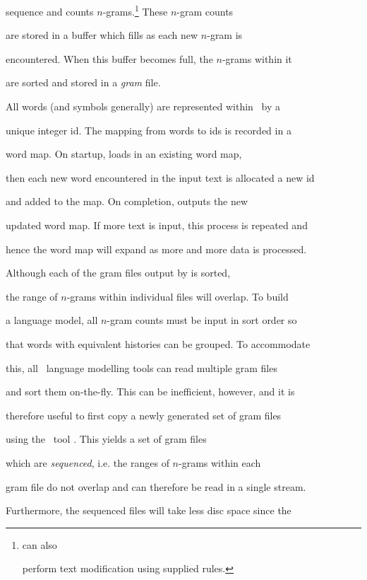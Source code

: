 sequence and counts $n$-grams.\footnote{ can also


perform text modification using supplied rules.}  These $n$-gram counts


are stored in a buffer which fills as each new $n$-gram is


encountered.  When this buffer becomes full, the $n$-grams within it


are sorted and stored in a \textit{gram} file.


All words (and symbols generally) are represented within \HTK\ by a


unique integer id.  The mapping from words to ids is recorded in a


word map.  On startup,  loads in an existing word map,


then each new word encountered in the input text is allocated a new id


and added to the map.  On completion,  outputs the new


updated word map.  If more text is input, this process is repeated and


hence the word map will expand as more and more data is processed.





Although each of the gram files output by  is sorted,


the range of $n$-grams within individual files will overlap.  To build


a language model, all $n$-gram counts must be input in sort order so


that words with equivalent histories can be grouped. To accommodate


this, all \HTK\ language modelling tools can read multiple gram files


and sort them on-the-fly.  This can be inefficient, however, and it is


therefore useful to first copy a newly generated set of gram files


using the \HLM\ tool .  This yields a set of gram files


which are \textit{sequenced}, i.e. the ranges of $n$-grams within each


gram file do not overlap and can therefore be read in a single stream.


Furthermore, the sequenced files will take less disc space since the


